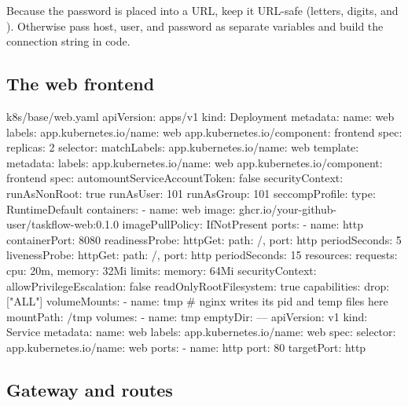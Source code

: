 \begin{warningbox}
Because the password is placed into a URL, keep it URL-safe (letters, digits,
\kc{-} and \kc{\_}). Otherwise pass host, user, and password as separate
variables and build the connection string in code.
\end{warningbox}

\subsection{The web frontend}

\begin{yamlcode}{k8s/base/web.yaml}
apiVersion: apps/v1
kind: Deployment
metadata:
  name: web
  labels:
    app.kubernetes.io/name: web
    app.kubernetes.io/component: frontend
spec:
  replicas: 2
  selector:
    matchLabels:
      app.kubernetes.io/name: web
  template:
    metadata:
      labels:
        app.kubernetes.io/name: web
        app.kubernetes.io/component: frontend
    spec:
      automountServiceAccountToken: false
      securityContext:
        runAsNonRoot: true
        runAsUser: 101
        runAsGroup: 101
        seccompProfile:
          type: RuntimeDefault
      containers:
        - name: web
          image: ghcr.io/your-github-user/taskflow-web:0.1.0
          imagePullPolicy: IfNotPresent
          ports:
            - name: http
              containerPort: 8080
          readinessProbe:
            httpGet: { path: /, port: http }
            periodSeconds: 5
          livenessProbe:
            httpGet: { path: /, port: http }
            periodSeconds: 15
          resources:
            requests: { cpu: 20m, memory: 32Mi }
            limits:   { memory: 64Mi }
          securityContext:
            allowPrivilegeEscalation: false
            readOnlyRootFilesystem: true
            capabilities:
              drop: ["ALL"]
          volumeMounts:
            - name: tmp                   # nginx writes its pid and temp files here
              mountPath: /tmp
      volumes:
        - name: tmp
          emptyDir: {}
---
apiVersion: v1
kind: Service
metadata:
  name: web
  labels:
    app.kubernetes.io/name: web
spec:
  selector:
    app.kubernetes.io/name: web
  ports:
    - name: http
      port: 80
      targetPort: http
\end{yamlcode}

\subsection{Gateway and routes}

